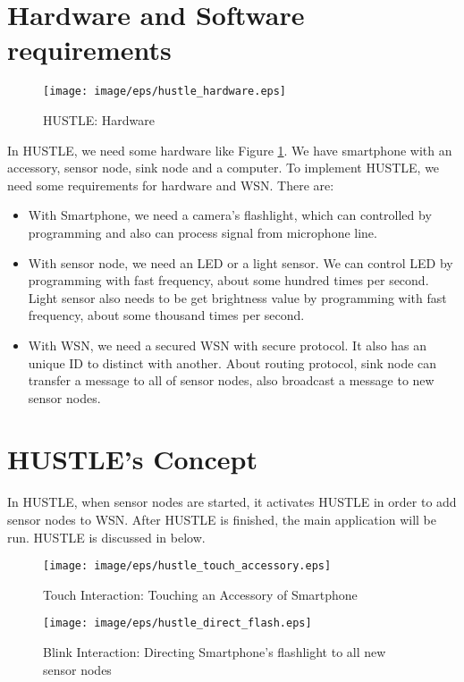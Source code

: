 \section{Hardware and Software requirements}\label{sec:hustle_requirement}

\begin{figure}[t]
\begin{center}
\texttt{[image: image/eps/hustle\_hardware.eps]}
\caption{HUSTLE: Hardware}
\label{fig:hustle_hardware}
\end{center}
\end{figure}

In HUSTLE, we need some hardware like Figure \ref{fig:hustle_hardware}. We have smartphone with an accessory, sensor node, sink node and a computer. To implement HUSTLE, we need some requirements for hardware and WSN. There are:

\begin{itemize}
	\item {With Smartphone, we need a camera's flashlight, which can controlled by programming and also can process signal from microphone line.} 
	\item{With sensor node, we need an LED or a light sensor. We can control LED by programming with fast frequency, about some hundred times per second. Light sensor also needs to be get brightness value by programming with fast frequency, about some thousand times per second.}
	\item{With WSN, we need a secured WSN with secure protocol. It also has an unique ID to distinct with another. About routing protocol, sink node can transfer a message to all of sensor nodes, also broadcast a message to new sensor nodes.}
\end{itemize}

\section{HUSTLE's Concept}

In HUSTLE, when sensor nodes are started, it activates HUSTLE in order to add sensor nodes to WSN. After HUSTLE is finished, the main application will be run. HUSTLE is discussed in below.

\begin{figure}[p]
\begin{center}
\texttt{[image: image/eps/hustle\_touch\_accessory.eps]}
\caption{Touch Interaction: Touching an Accessory of Smartphone}
\label{fig:hustle_touch_accessory}

\texttt{[image: image/eps/hustle\_direct\_flash.eps]}
\caption{Blink Interaction: Directing Smartphone's flashlight to all new sensor nodes}
\label{fig:hustle_direct_flash}
\end{center}
\end{figure}

